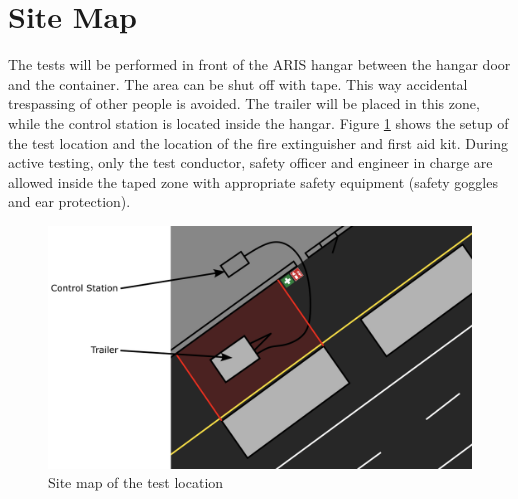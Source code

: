 \documentclass{article}
\begin{document}
\section{Site Map}
The tests will be performed in front of the ARIS hangar between the hangar door and the container. The area can be shut off with tape. This way accidental trespassing of other people is avoided. The trailer will be placed in this zone, while the control station is located inside the hangar. 
Figure \ref{fig:location-plan} shows the setup of the test location and the location of the fire extinguisher and first aid kit. During active testing, only the test conductor, safety officer and engineer in charge are allowed inside the taped zone with appropriate safety equipment (safety goggles and ear protection).
\begin{figure}[h]
    \centering
    \includegraphics[width=\textwidth]{assets/location-map.png}
    \caption{Site map of the test location}
    \label{fig:location-plan}
\end{figure}

\newpage

\newpage
\end{document}
